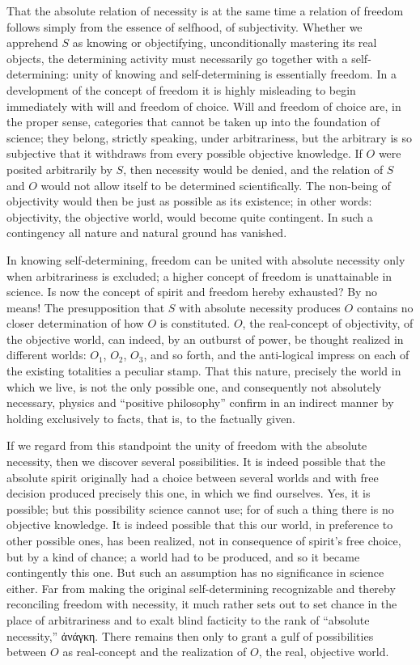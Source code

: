 \documentclass[12pt]{book}
\begin{document}
That the absolute relation of necessity is at the same time a relation of freedom follows simply
from the essence of selfhood, of subjectivity. Whether we apprehend $S$ as knowing or
objectifying, unconditionally mastering its real objects, the determining activity must
necessarily go together with a self-determining: unity of knowing and self-determining is
essentially freedom. In a development of the concept of freedom it is highly misleading to begin
immediately with will and freedom of choice. Will and freedom of choice are, in the proper sense,
categories that cannot be taken up into the foundation of science; they belong, strictly speaking,
under arbitrariness, but the arbitrary is so subjective that it withdraws from every possible
objective knowledge. If $O$ were posited arbitrarily by $S$, then necessity would be denied, and
the relation of $S$ and $O$ would not allow itself to be determined scientifically. The non-being
of objectivity would then be just as possible as its existence; in other words: objectivity, the
objective world, would become quite contingent. In such a contingency all nature and natural
ground has vanished.

In knowing self-determining, freedom can be united with absolute necessity only when
arbitrariness is excluded; a higher concept of freedom is unattainable in science. Is now the
concept of spirit and freedom hereby exhausted? By no means! The presupposition that $S$ with
absolute necessity produces $O$ contains no closer determination of how $O$ is constituted. $O$,
the real-concept of objectivity, of the objective world, can indeed, by an outburst of power, be
thought realized in different worlds: $O_1$, $O_2$, $O_3$, and so forth, and the anti-logical
impress on each of the existing totalities a peculiar stamp. That this nature, precisely the world
in which we live, is not the only possible one, and consequently not absolutely necessary, physics
and ``positive philosophy'' confirm in an indirect manner by holding exclusively to facts, that
is, to the factually given.

If we regard from this standpoint the unity of freedom with the absolute necessity, then we
discover several possibilities. It is indeed possible that the absolute spirit originally had a
choice between several worlds and with free decision produced precisely this one, in which we find
ourselves. Yes, it is possible; but this possibility science cannot use; for of such a thing there
is no objective knowledge. It is indeed possible that this our world, in preference to other
possible ones, has been realized, not in consequence of spirit's free choice, but by a kind of
chance; a world had to be produced, and so it became contingently this one. But such an assumption
has no significance in science either. Far from making the original self-determining recognizable
and thereby reconciling freedom with necessity, it much rather sets out to set chance in the place
of arbitrariness and to exalt blind facticity to the rank of ``absolute necessity,'' ἀνάγκη.
There remains then only to grant a gulf of possibilities between $O$ as real-concept and the
realization of $O$, the real, objective world.
\end{document}
